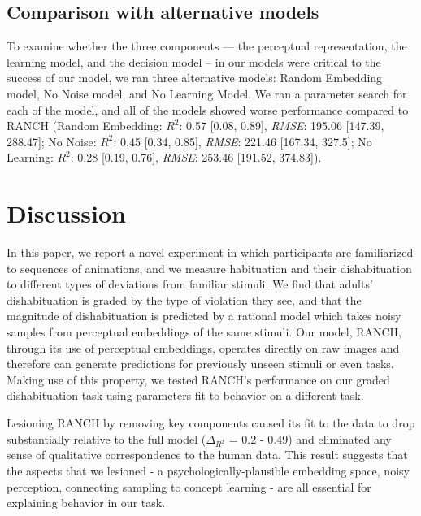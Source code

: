 \documentclass[10pt, letterpaper]{article}
\begin{document}
\hypertarget{comparison-with-alternative-models}{%
\subsection{Comparison with alternative
models}\label{comparison-with-alternative-models}}

To examine whether the three components --- the perceptual
representation, the learning model, and the decision model -- in our
models were critical to the success of our model, we ran three
alternative models: Random Embedding model, No Noise model, and No
Learning Model. We ran a parameter search for each of the model, and all
of the models showed worse performance compared to RANCH (Random
Embedding: \(R^2\): 0.57 {[}0.08, 0.89{]}, \emph{RMSE}: 195.06
{[}147.39, 288.47{]}; No Noise: \(R^2\): 0.45 {[}0.34, 0.85{]},
\emph{RMSE}: 221.46 {[}167.34, 327.5{]}; No Learning: \(R^2\): 0.28
{[}0.19, 0.76{]}, \emph{RMSE}: 253.46 {[}191.52, 374.83{]}).

\hypertarget{discussion}{%
\section{Discussion}\label{discussion}}

In this paper, we report a novel experiment in which participants are
familiarized to sequences of animations, and we measure habituation and
their dishabituation to different types of deviations from familiar
stimuli. We find that adults' dishabituation is graded by the type of
violation they see, and that the magnitude of dishabituation is
predicted by a rational model which takes noisy samples from perceptual
embeddings of the same stimuli. Our model, RANCH, through its use of
perceptual embeddings, operates directly on raw images and therefore can
generate predictions for previously unseen stimuli or even tasks. Making
use of this property, we tested RANCH's performance on our graded
dishabituation task using parameters fit to behavior on a different
task.

Lesioning RANCH by removing key components caused its fit to the data to
drop substantially relative to the full model (\(\Delta_{R^2}\) = 0.2 -
0.49) and eliminated any sense of qualitative correspondence to the
human data. This result suggests that the aspects that we lesioned - a
psychologically-plausible embedding space, noisy perception, connecting
sampling to concept learning - are all essential for explaining behavior
in our task.
\end{document}
